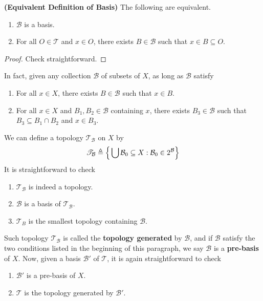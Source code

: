\documentclass{report}
\begin{document}
\begin{theorem}
  \textbf{(Equivalent Definition of Basis)} The following are equivalent.
\begin{enumerate}[label=(\alph*)]
  \item $\mathcal{B}$ is a basis.
  \item For all $O\in \mathscr{T }$ and $x\in O$, there exists $B \in \mathcal{B}$ such that $x \in B \subseteq O$.
\end{enumerate}
\end{theorem}
\begin{proof}
Check straightforward.
\end{proof}
\begin{mdframed}
In fact, given any collection $\mathcal{B}$ of subsets of $X$, as long as  $\mathcal{B}$ satisfy
\begin{enumerate}[label=(\alph*)]
  \item For all $x\in X$, there exists $B \in \mathcal{B}$ such that $x \in B$.
  \item For all $x \in X$ and $B_1,B_2 \in \mathcal{B}$ containing $x$, there exists  $B_3 \in \mathcal{B}$ such that $B_3 \subseteq B_1\cap B_2$ and $x \in B_3$.
\end{enumerate}
We can define a topology $\mathscr{T }_{\mathcal{B}}$ on $X$ by 
\begin{align*}
\mathscr{T }_{\mathcal{B}}\triangleq \Big\{ \bigcup \mathcal{B}_0 \subseteq X: \mathcal{B}_0 \in 2^\mathcal{B}  \Big\}
\end{align*}
It is straightforward to check
\begin{enumerate}[label=(\alph*)]
  \item $\mathscr{T }_\mathcal{B}$ is indeed a topology.
  \item $\mathcal{B}$ is a basis of  $\mathscr{T }_\mathcal{B}$. 
  \item $\mathscr{T }_B$ is the smallest topology containing $ \mathcal{B}$.
\end{enumerate}
Such topology $\mathscr{T }_\mathcal{B}$ is called the \textbf{topology generated} by $\mathcal{B}$, and if $\mathcal{B}$ satisfy the two conditions listed in the beginning of this paragraph, we say $\mathcal{B}$ is a \textbf{pre-basis} of $X$. Now, given a basis $\mathcal{B}'$ of $\mathscr{T }$, it is again straightforward to check 
\begin{enumerate}[label=(\alph*)]
  \item $\mathcal{B}'$ is a pre-basis of $X$. 
  \item $\mathscr{T }$ is the topology generated by $\mathcal{B}'$.

\end{enumerate}
\end{mdframed}
\end{document}
